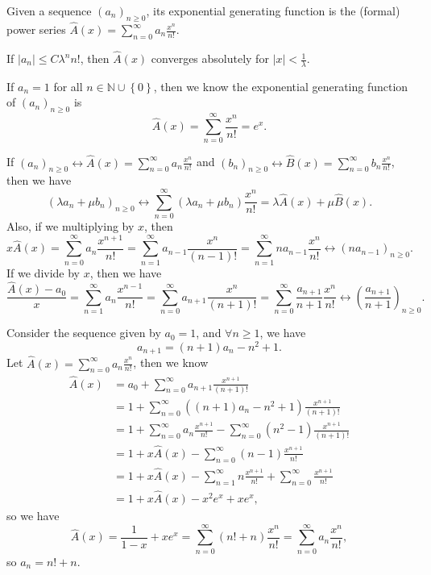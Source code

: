 \begin{definition}
    Given a sequence \(\left( a_n \right)_{n \ge 0} \), its exponential generating function is the (formal) power series \(\hat{A}(x) = \sum_{n=0}^{\infty} a_n \frac{x^n}{n!} \). 
    \begin{note}
        If \(\vert a_n \vert \le C \lambda ^n n! \), then \(\hat{A} (x)\) converges absolutely for \(\vert x \vert < \frac{1}{\lambda } \).  
    \end{note}  
\end{definition}

\begin{eg}
    If \(a_n = 1\) for all \(n \in \mathbb{N} \cup \left\{ 0 \right\} \), then we know the exponential generating function of \(\left( a_n \right)_{n \ge 0} \) is 
    \[
        \hat{A} (x) = \sum_{n=0}^{\infty} \frac{x^n}{n!} = e^x. 
    \] 
\end{eg}

If \((a_n)_{n \ge 0} \leftrightarrow \hat{A} (x) = \sum_{n=0}^{\infty} a_n \frac{x^n}{n!} \) and \((b_n)_{n \ge 0} \leftrightarrow \hat{B} (x) = \sum_{n=0}^{\infty} b_n \frac{x^n}{n!}\), then we have 
\[
    \left( \lambda a_n + \mu b_n \right)_{n \ge 0} \leftrightarrow \sum_{n=0}^{\infty} \left( \lambda a_n + \mu b_n \right) \frac{x^n}{n!} = \lambda \hat{A} (x) + \mu \hat{B} (x).   
\]  
Also, if we multiplying by \(x\), then 
\[
    x \hat{A} (x) = \sum_{n=0}^{\infty} a_n \frac{x^{n+1}}{n!} = \sum_{n=1}^{\infty} a_{n-1} \frac{x^n}{(n-1)!} = \sum_{n=1}^{\infty} n a_{n-1} \frac{x^n}{n!} \leftrightarrow \left( n a_{n-1} \right)_{n \ge 0}.    
\] 
If we divide by \(x\), then we have 
\[
    \frac{\hat{A} (x) - a_0}{x} = \sum_{n=1}^{\infty} a_n \frac{x^{n-1}}{n!} = \sum_{n=0}^{\infty} a_{n+1} \frac{x^n}{(n+1)!} = \sum_{n=0}^{\infty} \frac{a_{n+1}}{n+1} \frac{x^n}{n!} \leftrightarrow \left( \frac{a_{n+1}}{n+1} \right)_{n \ge 0}.  
\] 
\begin{eg}
    Consider the sequence given by \(a_0 = 1\), and \(\forall n \ge 1\), we have 
    \[
        a_{n+1} = (n+1) a_n - n^2 + 1.
    \]  
    Let \(\hat{A} (x) = \sum_{n=0}^{\infty} a_n \frac{x^n}{n!} \), then we know 
    \begin{align*}
        \hat{A} (x) &= a_0 + \sum_{n=0}^{\infty} a_{n+1} \frac{x^{n+1}}{(n+1)!} \\
        &= 1 + \sum_{n=0}^{\infty} \left( (n+1) a_n - n^2 + 1 \right) \frac{x^{n+1}}{(n+1)!} \\
        &= 1 + \sum_{n=0}^{\infty} a_n \frac{x^{n+1}}{n!} - \sum_{n=0}^{\infty} \left( n^2 - 1 \right)\frac{x^{n+1}}{(n+1)!} \\
        &= 1 + x \hat{A} (x) - \sum_{n=0}^{\infty} (n-1)\frac{x^{n+1}}{n!} \\
        &= 1 + x \hat{A} (x) - \sum_{n=1}^{\infty} n \frac{x^{n+1}}{n!} + \sum_{n=0}^{\infty} \frac{x^{n+1}}{n!} \\
        &= 1 + x \hat{A} (x) - x^2 e^x + x e^x,        
    \end{align*}
    so we have 
    \[
        \hat{A} (x) = \frac{1}{1-x} + xe^x = \sum_{n=0}^{\infty} \left( n! + n \right)\frac{x^n}{n!} = \sum_{n=0}^{\infty} a_n \frac{x^n}{n!} ,  
    \] so \(a_n = n! + n\). 
\end{eg}

